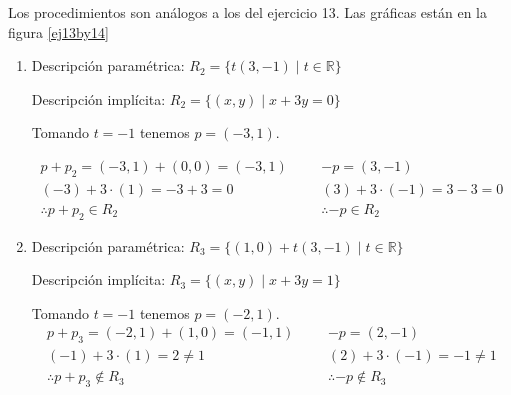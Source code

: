 \begin{enumerate}[resume,topsep=6pt, itemsep=.4cm]
\rta Los procedimientos son análogos a los del ejercicio 13. Las gráficas están en la figura \ref{ej13by14}

\begin{enumerate}
	\item 
Descripción paramétrica: $\boxed {R_2 = \{ t(3,-1) \; | \; t \in \mathbb{R} \} }$

Descripción implícita: $\boxed {R_2 = \{ (x,y) \; | \; x+3y = 0 \} }$

Tomando $t=-1$ tenemos $\boxed {p = (-3,1) }$.

\begin{equation*}
\begin{array}{ll|ll}
p+p_2 = (-3,1) + (0,0) = (-3,1)	&&& -p = (3,-1) \\
(-3) + 3 \cdot (1) = -3 + 3 = 0	&&& (3) + 3 \cdot (-1) = 3 -3 = 0 \\
\therefore  p+p_2 \in R_2   		&&& \therefore  -p \in R_2
\end{array}
\end{equation*}

	\item
	
Descripción paramétrica: $\boxed {R_3 = \{ (1,0) + t(3,-1) \; | \; t \in \mathbb{R} \} }$


Descripción implícita: $\boxed {R_3 = \{ (x,y) \; | \; x+3y = 1 \} }$

Tomando $t=-1$ tenemos $\boxed {p = (-2,1) }$.
\begin{equation*}
\begin{array}{ll|ll}
p+p_3 = (-2,1) + (1,0) = (-1,1)	&&& -p = (2,-1) \\
(-1) + 3 \cdot (1) = 2 \neq 1		&&& (2) + 3 \cdot (-1) = -1 \neq 1 \\
\therefore  p+p_3 \notin R_3  		&&& \therefore  -p \notin R_3
\end{array}
\end{equation*}


\end{enumerate}


\end{enumerate}
